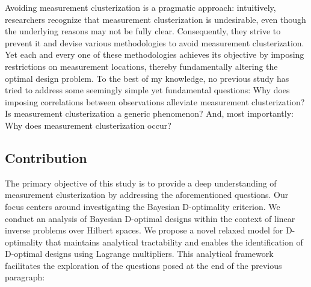 Avoiding measurement clusterization is a pragmatic approach:
intuitively, researchers recognize that measurement clusterization is
undesirable, even though the underlying reasons may not be fully
clear. Consequently, they strive to prevent it and devise various
methodologies to avoid measurement clusterization. Yet each and every
one of these methodologies achieves its objective by imposing
restrictions on measurement locations, thereby fundamentally altering
the optimal design problem. To the best of my knowledge, no previous
study has tried to address some seemingly simple yet fundamental
questions:
%
Why does imposing correlations between observations alleviate
measurement clusterization?
%
Is measurement clusterization a generic phenomenon? 
%
And, most importantly: Why does measurement clusterization occur?
%
%


\subsection{Contribution}
The primary objective of this study is to provide a deep understanding
of measurement clusterization by addressing the aforementioned
questions. Our focus centers around investigating the Bayesian
D-optimality criterion. We conduct an analysis of Bayesian D-optimal
designs within the context of linear inverse problems over Hilbert
spaces. We propose a novel relaxed model for D-optimality that
maintains analytical tractability and enables the identification of
D-optimal designs using Lagrange multipliers. This analytical
framework facilitates the exploration of the questions posed at the
end of the previous paragraph:


